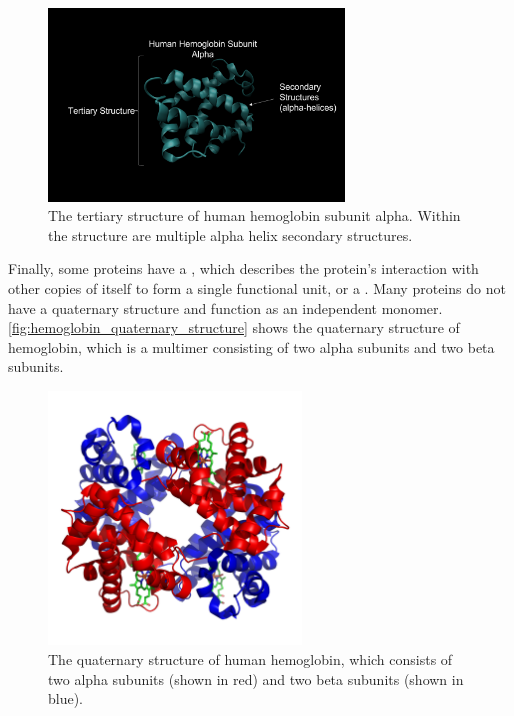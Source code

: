 \begin{figure}[h]
	\centering
	\mySfFamily
	\includegraphics[width = 0.7\textwidth]{../images/hemoglobin_tertiary_structure.png}
	\caption{The tertiary structure of human hemoglobin subunit alpha. Within the structure are multiple alpha helix secondary structures.}
	\label{fig:hemoglobin_tertiary_structure}
\end{figure}

Finally, some proteins have a , which describes the protein’s interaction with other copies of itself to form a single functional unit, or a . Many proteins do not have a quaternary structure and function as an independent monomer. \autoref{fig:hemoglobin_quaternary_structure} shows the quaternary structure of hemoglobin, which is a multimer consisting of two alpha subunits and two beta subunits.

\begin{figure}[h]
	\centering
	\mySfFamily
	\includegraphics[width = 0.6\textwidth]{../images/hemoglobin_quaternary_structure.png}
	\caption{The quaternary structure of human hemoglobin, which consists of two alpha subunits (shown in red) and two beta subunits (shown in blue).}
	\label{fig:hemoglobin_quaternary_structure}
\end{figure}

